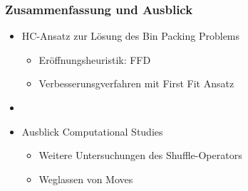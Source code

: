 \documentclass{beamer}
\begin{document}
\begin{frame}
\frametitle{Zusammenfassung und Ausblick}
\begin{itemize}
\item HC-Ansatz zur Lösung des Bin Packing Problems
\begin{itemize}
\item Eröffnungsheuristik: FFD
\item Verbesserunsgverfahren mit First Fit Ansatz
\end{itemize}
\item[] 
\item Ausblick Computational Studies
\begin{itemize}
\item Weitere Untersuchungen des Shuffle-Operators
\item Weglassen von Moves
\end{itemize}
\end{itemize}


\end{frame}
\end{document}
